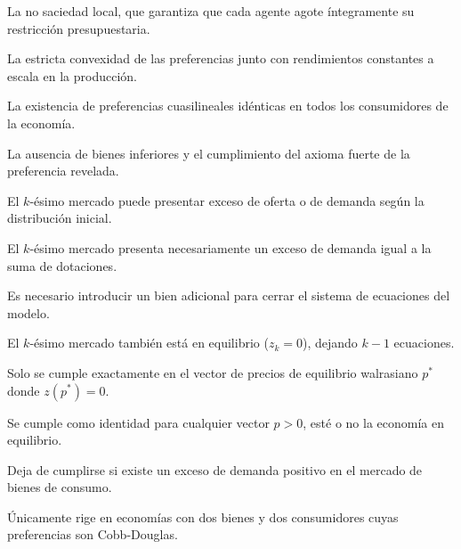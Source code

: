 \begin{opts}
    \item La no saciedad local, que garantiza que cada agente agote íntegramente su restricción presupuestaria.
    \item La estricta convexidad de las preferencias junto con rendimientos constantes a escala en la producción.
    \item La existencia de preferencias cuasilineales idénticas en todos los consumidores de la economía.
    \item La ausencia de bienes inferiores y el cumplimiento del axioma fuerte de la preferencia revelada.
\end{opts}

\begin{opts}
    \item El $k$-ésimo mercado puede presentar exceso de oferta o de demanda según la distribución inicial.
    \item El $k$-ésimo mercado presenta necesariamente un exceso de demanda igual a la suma de dotaciones.
    \item Es necesario introducir un bien adicional para cerrar el sistema de ecuaciones del modelo.
    \item El $k$-ésimo mercado también está en equilibrio ($z_k = 0$), dejando $k-1$ ecuaciones.
\end{opts}

\begin{opts}
    \item Solo se cumple exactamente en el vector de precios de equilibrio walrasiano $p^*$ donde $z(p^*) = 0$.
    \item Se cumple como identidad para cualquier vector $p > 0$, esté o no la economía en equilibrio.
    \item Deja de cumplirse si existe un exceso de demanda positivo en el mercado de bienes de consumo.
    \item Únicamente rige en economías con dos bienes y dos consumidores cuyas preferencias son Cobb-Douglas.
\end{opts}

